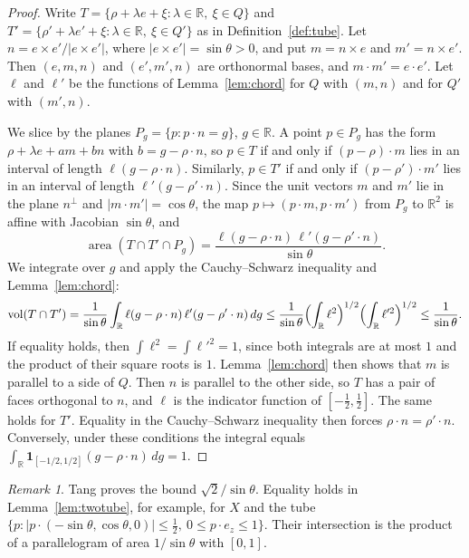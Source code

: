 \documentclass[11pt]{amsart}
\theoremstyle{definition}
\theoremstyle{remark}
\newtheorem{remark}[theorem]{Remark}
\numberwithin{equation}{section}
\newcommand{\R}{\mathbb{R}}
\newcommand{\vol}{\operatorname{vol}}
\newcommand{\area}{\operatorname{area}}
\newcommand{\one}{\mathbf{1}}
\begin{document}
\begin{proof}
Write $T=\{\rho+\lambda e+\xi:\lambda\in\R,\ \xi\in Q\}$ and $T'=\{\rho'+\lambda e'+\xi:\lambda\in\R,\ \xi\in Q'\}$ as in Definition~\ref{def:tube}. Let $n=e\times e'/|e\times e'|$, where $|e\times e'|=\sin\theta>0$, and put $m=n\times e$ and $m'=n\times e'$. Then $(e,m,n)$ and $(e',m',n)$ are orthonormal bases, and $m\cdot m'=e\cdot e'$. Let $\ell$ and $\ell'$ be the functions of Lemma~\ref{lem:chord} for $Q$ with $(m,n)$ and for $Q'$ with $(m',n)$.

We slice by the planes $P_g=\{p:p\cdot n=g\}$, $g\in\R$. A point $p\in P_g$ has the form $\rho+\lambda e+am+bn$ with $b=g-\rho\cdot n$, so $p\in T$ if and only if $(p-\rho)\cdot m$ lies in an interval of length $\ell(g-\rho\cdot n)$. Similarly, $p\in T'$ if and only if $(p-\rho')\cdot m'$ lies in an interval of length $\ell'(g-\rho'\cdot n)$. Since the unit vectors $m$ and $m'$ lie in the plane $n^\perp$ and $|m\cdot m'|=\cos\theta$, the map $p\mapsto(p\cdot m,p\cdot m')$ from $P_g$ to $\R^2$ is affine with Jacobian $\sin\theta$, and
\[
\area(T\cap T'\cap P_g)=\frac{\ell(g-\rho\cdot n)\,\ell'(g-\rho'\cdot n)}{\sin\theta}.
\]
We integrate over $g$ and apply the Cauchy--Schwarz inequality and Lemma~\ref{lem:chord}:
\[
\vol(T\cap T')=\frac1{\sin\theta}\int_\R\ell(g-\rho\cdot n)\,\ell'(g-\rho'\cdot n)\,dg\le\frac1{\sin\theta}\Bigl(\int_\R\ell^2\Bigr)^{1/2}\Bigl(\int_\R\ell'^2\Bigr)^{1/2}\le\frac1{\sin\theta}.
\]
If equality holds, then $\int\ell^2=\int\ell'^2=1$, since both integrals are at most $1$ and the product of their square roots is $1$. Lemma~\ref{lem:chord} then shows that $m$ is parallel to a side of $Q$. Then $n$ is parallel to the other side, so $T$ has a pair of faces orthogonal to $n$, and $\ell$ is the indicator function of $[-\frac12,\frac12]$. The same holds for $T'$. Equality in the Cauchy--Schwarz inequality then forces $\rho\cdot n=\rho'\cdot n$. Conversely, under these conditions the integral equals $\int_\R\one_{[-1/2,1/2]}(g-\rho\cdot n)\,dg=1$.
\end{proof}

\begin{remark}\label{rem:twotube}
Tang \cite[Lemma~7.1]{Tan26a} proves the bound $\sqrt2/\sin\theta$. Equality holds in Lemma~\ref{lem:twotube}, for example, for $X$ and the tube $\{p:|p\cdot(-\sin\theta,\cos\theta,0)|\le\frac12,\ 0\le p\cdot e_z\le1\}$. Their intersection is the product of a parallelogram of area $1/\sin\theta$ with $[0,1]$.
\end{remark}
\end{document}

